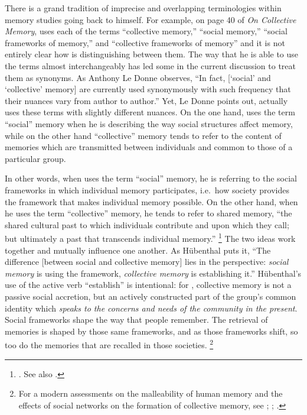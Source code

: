 There is a grand tradition of imprecise and overlapping terminologies within memory studies going back to \halbwachs himself. For example, on page 40 of \emph{On Collective Memory}, \halbwachs uses each of the terms ``collective memory,'' ``social memory,'' ``social frameworks of memory,'' and ``collective frameworks of memory'' and it is not entirely clear how \halbwachs is distinguishing between them. The way that he is able to use the terms almost interchangeably has led some in the current discussion to treat them as synonyms. As Anthony Le Donne observes, ``In fact, {[}`social' and `collective' memory{]} are currently used synonymously with such frequency that their nuances vary from author to author.''\autocite[42 n.8]{ledonne2009} Yet, Le Donne points out, \halbwachs actually uses these terms with slightly different nuances. On the one hand, \halbwachs uses the term ``social'' memory when he is describing the way social structures affect memory, while on the other hand ``collective'' memory tends to refer to the content of memories which are transmitted between individuals and common to those of a particular group.  

In other words, when \halbwachs uses the term ``social'' memory, he is referring to the social frameworks in which individual memory participates, i.e.~how society provides the framework that makes individual memory possible.\autocite[180]{hubenthal_carstens-hasselbalch2012} On the other hand, when he uses the term ``collective'' memory, he tends to refer to shared memory, ``the shared cultural past to which individuals contribute and upon which they call; but ultimately a past that transcends individual memory.''%
%
\footnote{\cite[360]{keith_ec2015}. See also \cite[180]{hubenthal_carstens-hasselbalch2012}.}
%
The two ideas work together and mutually influence one another. As Hübenthal puts it, ``The difference [between social and collective memory] lies in the perspective: \emph{social memory} is using the framework, \emph{collective memory} is establishing it.''\autocite[180.]{hubenthal_carstens-hasselbalch2012} Hübenthal's use of the active verb ``establish'' is intentional: for \halbwachs, collective memory is not a passive social accretion, but an actively constructed part of the group's common identity which \emph{speaks to the concerns and needs of the community in the present}. Social frameworks shape the way that people remember. The retrieval of memories is shaped by those same frameworks, and as those frameworks shift, so too do the memories that are recalled in those societies.%
%
\footnote{For a modern assessments on the malleability of human memory and the effects of social networks on the formation of collective memory, see \cite{coman-etal_pnas2016}; \cite{yamashiro-hirst_jarmc2014}; \cite{coman-etal_yang-etal2012}.}
%

